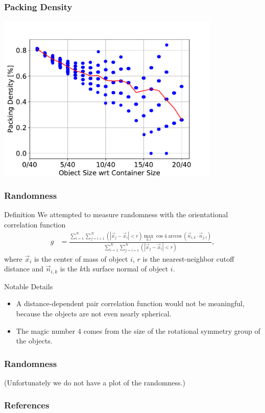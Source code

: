\documentclass[sumlimits, intlimits]{beamer}
\begin{document}
\begin{frame}
\frametitle{Packing Density}
\centering
\def \h{8cm}
\includegraphics[height=\h]{box2d}
\end{frame}

\begin{frame}
\frametitle{Randomness}
\begin{block}{Definition}
We attempted to measure randomness with the orientational correlation function
\begin{align*}
g & = \frac{\sum_{i = 1}^N \sum_{j = i + 1}^N (|\vec x_j - \vec x_i| < r) \max_{k, l} \cos 4 \arccos (\vec n_{i, k} \cdot \vec n_{j, l})}
{\sum_{i = 1}^N \sum_{j = i + 1}^N (|\vec x_j - \vec x_i| < r)},
\end{align*}
where $\vec x_i$ is the center of mass of object $i$,
$r$ is the nearest-neighbor cutoff distance and
$\vec n_{i, k}$ is the $k$th surface normal of object $i$.
\end{block}
\begin{block}{Notable Details}
\begin{itemize}
\item A distance-dependent pair correlation function would not be meaningful,
because the objects are not even nearly spherical.
\item The magic number $4$ comes from the size
of the rotational symmetry group of the objects.
\end{itemize}
\end{block}
\end{frame}

\begin{frame}
\frametitle{Randomness}
\centering
\def \h{8cm}
(Unfortunately we do not have a plot of the randomness.)
\end{frame}

\begin{frame}[allowframebreaks]
\frametitle{References}
\printbibliography
\end{frame}
\end{document}
